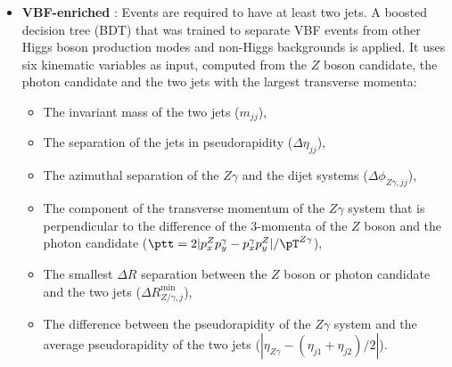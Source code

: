 \begin{itemize}
\item   \textbf{VBF-enriched} : Events are required to have at least two jets. 
  A boosted decision tree (BDT) that was trained to separate VBF 
  events from other Higgs boson production modes and non-Higgs backgrounds is applied. It uses six kinematic
  variables as input, computed from the $Z$ boson candidate, the photon candidate and the two jets with
  the largest transverse momenta: 
  \begin{itemize}
  \item The invariant mass of the two jets ($m_{jj}$),
  \item The separation of the jets
  in pseudorapidity ($\Delta\eta_{jj}$),
  \item The azimuthal separation of the $Z\gamma$ and the dijet systems
  ($\Delta\phi_{Z\gamma,jj}$),
  \item The component of the transverse momentum of the $Z\gamma$ system 
  that is perpendicular to the difference of the 3-momenta of the $Z$ boson and the photon
  candidate ($\ptt = 2{|p_{x}^{Z} p_{y}^{\gamma} - p_{x}^{\gamma} p_{y}^{Z}|}/{\pT^{Z\gamma}}$),
  \item The smallest $\Delta R$ separation between the $Z$ boson or photon candidate and 
  the two jets ($\Delta R^\mathrm{min}_{Z/\gamma, j}$),
  \item  The difference between the pseudorapidity of the $Z\gamma$ system and the average 
    pseudorapidity of the two jets ($|\eta_{Z\gamma}-(\eta_{j1} + \eta_{j2})/2|$).
  \end{itemize}


\end{itemize}
